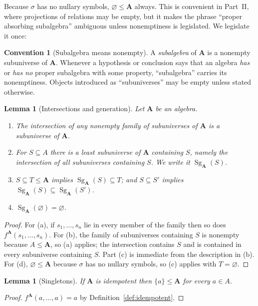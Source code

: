 \documentclass[11pt]{article}
\theoremstyle{mainplain}
\newtheorem{lemma}[theorem]{Lemma}
\theoremstyle{mainroman}
\theoremstyle{definition}
\newtheorem{convention}[theorem]{Convention}
\newcommand{\alphlabels}{\renewcommand{\labelenumi}{\textup{(\alph{enumi})}}%
  \renewcommand{\theenumi}{\alph{enumi}}}
\providecommand{\tightlist}{\setlength{\itemsep}{0pt}\setlength{\parskip}{0pt}}
\numberwithin{equation}{section}
\DeclareMathOperator{\Sg}{Sg}
\newcommand{\bA}{\mathbf A}
\begin{document}
Because $\sigma$ has no nullary symbols, $\varnothing\le\bA$ always. This is
convenient in Part~II, where projections of relations may be empty, but it makes
the phrase ``proper absorbing subalgebra'' ambiguous unless nonemptiness is
legislated. We legislate it once:

\begin{convention}[Subalgebra means nonempty]\label{conv:subalgebra}
A \emph{subalgebra} of $\bA$ is a nonempty subuniverse of $\bA$. Whenever a
hypothesis or conclusion says that an algebra \emph{has} or \emph{has no} proper
subalgebra with some property, ``subalgebra'' carries its nonemptiness. Objects
introduced as ``subuniverses'' may be empty unless stated otherwise.
\end{convention}

\begin{lemma}[Intersections and generation]\label{lem:generation}
Let $\bA$ be an algebra.
\begin{enumerate}\alphlabels\tightlist
\item The intersection of any nonempty family of subuniverses of $\bA$ is a
      subuniverse of $\bA$.
\item For $S\subseteq A$ there is a least subuniverse of $\bA$ containing $S$,
      namely the intersection of all subuniverses containing $S$. We write it
      $\Sg_{\bA}(S)$.
\item $S\subseteq T\le\bA$ implies $\Sg_{\bA}(S)\subseteq T$; and
      $S\subseteq S'$ implies $\Sg_{\bA}(S)\subseteq\Sg_{\bA}(S')$.
\item $\Sg_{\bA}(\varnothing)=\varnothing$.
\end{enumerate}
\end{lemma}
\begin{proof}
For (a), if $s_1,\dots,s_n$ lie in every member of the family then so does
$f^{\bA}(s_1,\dots,s_n)$. For (b), the family of subuniverses containing $S$ is
nonempty because $A\le\bA$, so (a) applies; the intersection contains $S$ and is
contained in every subuniverse containing $S$. Part (c) is immediate from the
description in (b). For (d), $\varnothing\le\bA$ because $\sigma$ has no nullary
symbols, so (c) applies with $T=\varnothing$.
\end{proof}

\begin{lemma}[Singletons]\label{lem:singleton}
If $\bA$ is idempotent then $\{a\}\le\bA$ for every $a\in A$.
\end{lemma}
\begin{proof}
$f^{\bA}(a,\dots,a)=a$ by Definition~\ref{def:idempotent}.
\end{proof}
\end{document}
